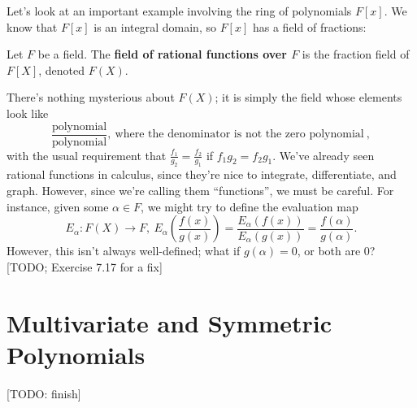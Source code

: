 \documentclass[math1530-lecture-notes]{subfiles}
\begin{document}
Let's look at an important example involving the ring of polynomials $F[x]$. We know that $F[x]$ is
an integral domain, so $F[x]$ has a field of fractions:
\begin{definition}{}
  Let $F$ be a field. The \textbf{field of rational functions over $F$} is the fraction field of
  $F[X]$, denoted $F(X)$.
\end{definition}
There's nothing mysterious about $F(X)$; it is simply the field whose elements look like \[
  \frac{\text{polynomial}}{\text{polynomial}},~\text{where the denominator is not the zero
  polynomial}~
,\] with the usual requirement that $\frac{f_1}{g_2}=\frac{f_2}{g_1}$ if $f_1g_2=f_2g_1$. We've
already seen rational functions in calculus, since they're nice to integrate, differentiate, and
graph. However, since we're calling them ``functions'', we must be careful. For instance, given some
$\alpha\in F$, we might try to define the evaluation map \[
  E_\alpha:F(X)\longrightarrow F,\
  E_\alpha(\frac{f(x)}{g(x)})=\frac{E_\alpha(f(x))}{E_\alpha(g(x))}=\frac{f(\alpha)}{g(\alpha)}
.\] However, this isn't always well-defined; what if $g(\alpha)=0$, or both are $0$? [TODO; Exercise
7.17 for a fix]

\section{Multivariate and Symmetric Polynomials}
[TODO: finish]
\end{document}
